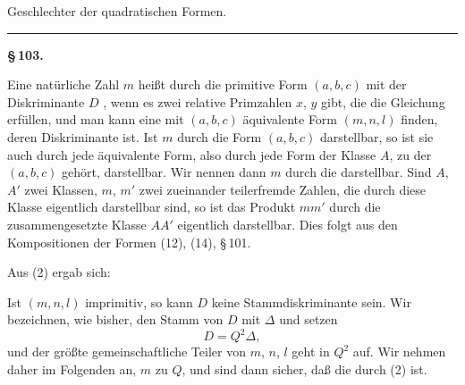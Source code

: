 \begin{center}

Geschlechter der quadratischen Formen.
\end{center}
\begin{center}\rule{0.2\linewidth}{0.4pt}\end{center}

\begin{center}
\textbf{\S\,103. }
\end{center}

Eine natürliche Zahl $m$ heißt durch die primitive Form $(a,b,c)$ mit der Diskriminante $D$ , wenn es zwei relative Primzahlen $x$, $y$ gibt, die die Gleichung
erfüllen, und man kann eine mit $(a,b,c)$ äquivalente Form $(m,n,l)$ finden, deren Diskriminante
ist. Ist $m$ durch die Form $(a,b,c)$ darstellbar, so ist sie auch durch jede äquivalente Form, also durch jede Form der Klasse $A$, zu der $(a,b,c)$ gehört, darstellbar. Wir nennen dann $m$ durch die  darstellbar. Sind $A$, $A'$ zwei Klassen, $m$, $m'$ zwei zueinander teilerfremde Zahlen, die durch diese Klasse eigentlich darstellbar sind, so ist das Produkt $mm'$ durch die zusammengesetzte Klasse $AA'$ eigentlich darstellbar. Dies folgt aus den Kompositionen der Formen (12), (14), \S\,101.

Aus (2) ergab sich:

Ist $(m,n,l)$ imprimitiv, so kann $D$ keine Stammdiskriminante sein. Wir bezeichnen, wie bisher, den Stamm von $D$ mit $\Delta$ und setzen
\[
D = Q^2 \Delta,
\]
und der größte gemeinschaftliche Teiler von $m$, $n$, $l$ geht in $Q^2$ auf. Wir nehmen daher im Folgenden an, $m$  zu $Q$, und sind dann sicher, daß die durch (2)  ist.

